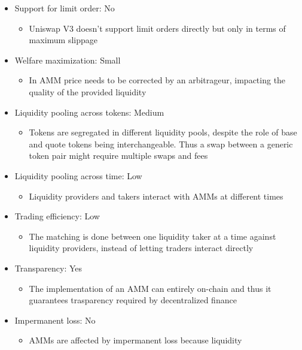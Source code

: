 \documentclass[11pt, reqno]{amsart}
\theoremstyle{definition}
\theoremstyle{remark}
\begin{document}
\begin{itemize}
	\item Support for limit order: No
	      \begin{itemize}
		      \item Uniswap V3 doesn't support limit orders directly but only in terms of
                  maximum slippage
	      \end{itemize}
	\item Welfare maximization: Small
	      \begin{itemize}
              \item In AMM price needs to be corrected by an arbitrageur,
                impacting the quality of the provided liquidity
	      \end{itemize}
	\item Liquidity pooling across tokens: Medium
	      \begin{itemize}
            \item Tokens are segregated in different liquidity pools, despite
              the role of base and quote tokens being interchangeable.
              Thus a swap between a generic token pair might require multiple
              swaps and fees
	      \end{itemize}
	\item Liquidity pooling across time: Low
	      \begin{itemize}
            \item Liquidity providers and takers interact with AMMs at different times
	      \end{itemize}
	\item Trading efficiency: Low
	      \begin{itemize}
              \item The matching is done between one liquidity taker at a time against
                liquidity providers, instead of letting traders interact directly
	      \end{itemize}
	\item Transparency: Yes
	      \begin{itemize}
              \item The implementation of an AMM can entirely on-chain and thus
                it guarantees trasparency required by decentralized finance
	      \end{itemize}
	\item Impermanent loss: No
	      \begin{itemize}
              \item AMMs are affected by impermanent loss because liquidity

\end{itemize}
\end{itemize}
\end{document}
